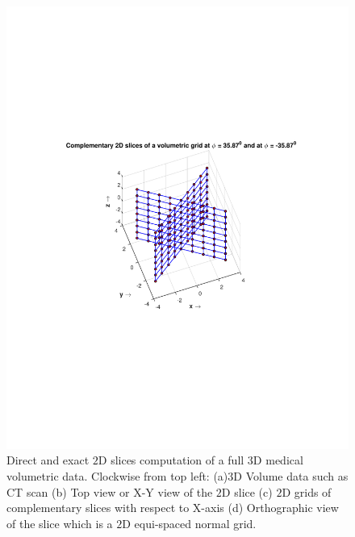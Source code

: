 \documentclass{UCF_ETD}
\begin{document}
\begin{figure}[H]
\begin{center}
\includegraphics[scale=0.5]{FVR/ComplementarySlices}
\caption{Direct and exact $2$D slices computation of a full $3$D medical volumetric data. Clockwise from top left: (a)$3$D Volume data such as CT scan (b) Top view or X-Y view of the $2$D slice (c) $2$D grids of complementary slices with respect to X-axis (d) Orthographic view of the slice which is a $2$D equi-spaced normal grid.  }
\label{DiagramsOfSliceInVolume.fig}
\end{center}
\end{figure}
\end{document}
